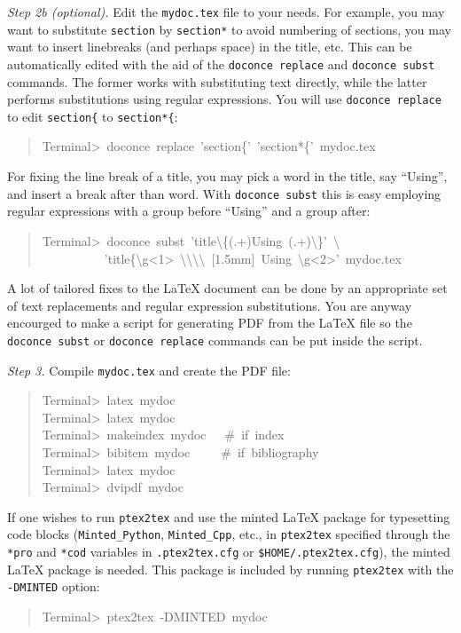 \documentclass[a4paper]{article}
\begin{document}
\emph{Step 2b (optional).} Edit the \texttt{mydoc.tex} file to your needs.
For example, you may want to substitute \texttt{section} by \texttt{section*} to
avoid numbering of sections, you may want to insert linebreaks
(and perhaps space) in the title, etc. This can be automatically
edited with the aid of the \texttt{doconce replace} and \texttt{doconce subst}
commands. The former works with substituting text directly, while the
latter performs substitutions using regular expressions.
You will use \texttt{doconce replace} to edit \texttt{section\{} to \texttt{section*\{}:
%
\begin{quote}{\ttfamily \raggedright \noindent
Terminal>~doconce~replace~'section\{'~'section*\{'~mydoc.tex
}
\end{quote}

For fixing the line break of a title, you may pick a word in the
title, say ``Using'', and insert a break after than word. With
\texttt{doconce subst} this is easy employing regular expressions with
a group before ``Using'' and a group after:
%
\begin{quote}{\ttfamily \raggedright \noindent
Terminal>~doconce~subst~'title\textbackslash{}\{(.+)Using~(.+)\textbackslash{}\}'~\textbackslash{}\\
~~~~~~~~~~'title\{\textbackslash{}g<1>~\textbackslash{}\textbackslash{}\textbackslash{}\textbackslash{}~{[}1.5mm{]}~Using~\textbackslash{}g<2>'~mydoc.tex
}
\end{quote}

A lot of tailored fixes to the LaTeX document can be done by
an appropriate set of text replacements and regular expression
substitutions. You are anyway encourged to make a script for
generating PDF from the LaTeX file so the \texttt{doconce subst} or
\texttt{doconce replace} commands can be put inside the script.

\emph{Step 3.} Compile \texttt{mydoc.tex}
and create the PDF file:
%
\begin{quote}{\ttfamily \raggedright \noindent
Terminal>~latex~mydoc\\
Terminal>~latex~mydoc\\
Terminal>~makeindex~mydoc~~~\#~if~index\\
Terminal>~bibitem~mydoc~~~~~\#~if~bibliography\\
Terminal>~latex~mydoc\\
Terminal>~dvipdf~mydoc
}
\end{quote}

If one wishes to run \texttt{ptex2tex} and use the minted LaTeX package for
typesetting code blocks (\texttt{Minted\_Python}, \texttt{Minted\_Cpp}, etc., in
\texttt{ptex2tex} specified through the \texttt{*pro} and \texttt{*cod} variables in
\texttt{.ptex2tex.cfg} or \texttt{\$HOME/.ptex2tex.cfg}), the minted LaTeX package is
needed.  This package is included by running \texttt{ptex2tex} with the
\texttt{-DMINTED} option:
%
\begin{quote}{\ttfamily \raggedright \noindent
Terminal>~ptex2tex~-DMINTED~mydoc
}
\end{quote}
\end{document}
